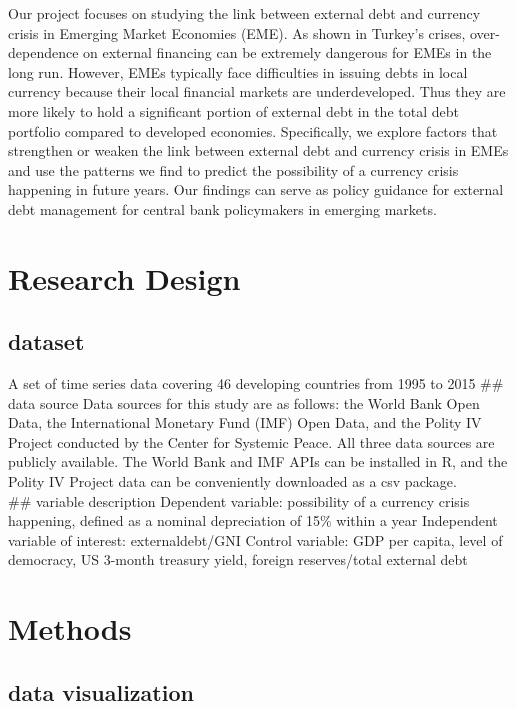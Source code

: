 \documentclass[12pt,]{article}
\begin{document}
Our project focuses on studying the link between external debt and
currency crisis in Emerging Market Economies (EME). As shown in Turkey's
crises, over-dependence on external financing can be extremely dangerous
for EMEs in the long run. However, EMEs typically face difficulties in
issuing debts in local currency because their local financial markets
are underdeveloped. Thus they are more likely to hold a significant
portion of external debt in the total debt portfolio compared to
developed economies. Specifically, we explore factors that strengthen or
weaken the link between external debt and currency crisis in EMEs and
use the patterns we find to predict the possibility of a currency crisis
happening in future years. Our findings can serve as policy guidance for
external debt management for central bank policymakers in emerging
markets.

\section{Research Design}\label{research-design}

\subsection{dataset}\label{dataset}

A set of time series data covering 46 developing countries from 1995 to
2015 \#\# data source Data sources for this study are as follows: the
World Bank Open Data, the International Monetary Fund (IMF) Open Data,
and the Polity IV Project conducted by the Center for Systemic Peace.
All three data sources are publicly available. The World Bank and IMF
APIs can be installed in R, and the Polity IV Project data can be
conveniently downloaded as a csv package.\\
\#\# variable description Dependent variable: possibility of a currency
crisis happening, defined as a nominal depreciation of 15\% within a
year Independent variable of interest: externaldebt/GNI Control
variable: GDP per capita, level of democracy, US 3-month treasury yield,
foreign reserves/total external debt

\section{Methods}\label{methods}

\subsection{data visualization}\label{data-visualization}
\end{document}
